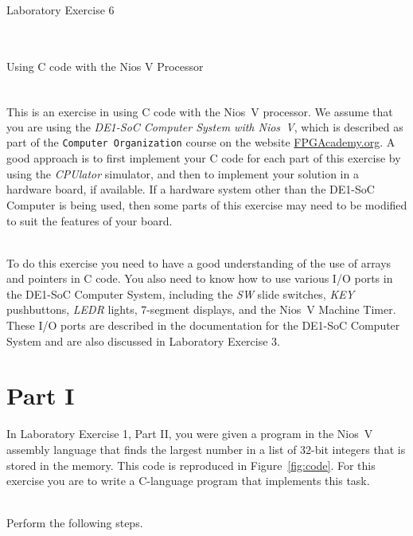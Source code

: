 \documentclass[epsfig,10pt,fullpage]{article}
\begin{document}
~\\
\centerline{\huge Laboratory Exercise 6}
~\\
\centerline{\large Using C code with the Nios\textsuperscript{\textregistered} V Processor}
~\\

This is an exercise in using C code with the Nios\textsuperscript{\textregistered}~V processor.
We assume that you are using the {\it DE1-SoC Computer System with Nios~V},
which is described as part of the \texttt{Computer Organization} course on the website
{\href{https://www.fpgacademy.org/courses.html} {FPGAcademy.org}}.
A good approach is to first implement your C code for each part of this exercise by 
using the {\it CPUlator} simulator, and then to implement your solution in a hardware board,
if available.  If a hardware system other than the DE1-SoC Computer is being used, then 
some parts of this exercise may need to be modified to suit the features of your board. 

~\\
To do this exercise you need to have a good understanding of the use of arrays and 
pointers in C code. You also need to know how to use various I/O ports in the
DE1-SoC Computer System, including the {\it SW} slide switches, {\it KEY} pushbuttons,
{\it LEDR} lights, 7-segment displays, and the Nios~V Machine Timer. 
These I/O ports are described in the documentation for the 
DE1-SoC Computer System and are also discussed in Laboratory Exercise 3.

\section*{Part I}
In Laboratory Exercise 1, Part II, you were given a program in the Nios~V assembly language 
that finds the largest number in a list of 32-bit integers that is stored in the memory. 
This code is reproduced in Figure~\ref{fig:code}. For this exercise you are to write a 
C-language program that implements this task.

~\\
Perform the following steps.
\end{document}
